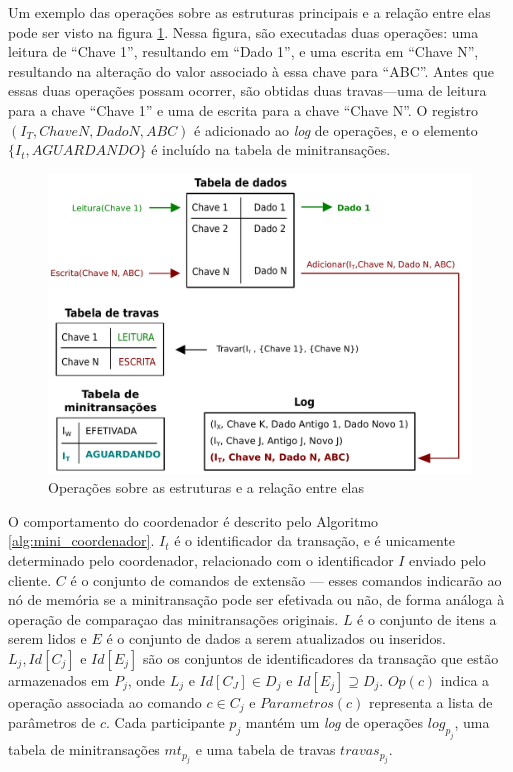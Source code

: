 \documentclass[11pt,twoside,a4paper]{book}
\begin{document}
Um exemplo das operações sobre as estruturas principais e a relação entre elas pode ser visto na figura \ref{fig:estruturas}. Nessa figura, são executadas duas operações: uma leitura de ``Chave 1'', resultando em ``Dado 1'', e uma escrita em ``Chave N'', resultando na alteração do valor associado à essa chave para ``ABC''. Antes que essas duas operações possam ocorrer, são obtidas duas travas---uma de leitura para a chave ``Chave 1'' e uma de escrita para a chave ``Chave N''. O registro $(I_T, Chave N, Dado N, ABC)$ é adicionado ao \emph{log} de operações, e o elemento $\{I_t, AGUARDANDO\}$ é incluído na tabela de minitransações.

\begin{figure}
  \centering
  \includegraphics[width=.90\textwidth]{estruturas} 
  \caption{Operações sobre as estruturas e a relação entre elas}
  \label{fig:estruturas} 
\end{figure}

O comportamento do coordenador é descrito pelo Algoritmo \ref{alg:mini_coordenador}. $I_t$ é o identificador da transação, e é unicamente determinado pelo coordenador, relacionado com o identificador $I$ enviado pelo cliente. $C$ é o conjunto de comandos de extensão --- esses comandos indicarão ao nó de memória se a minitransação pode ser efetivada ou não, de forma análoga à operação de comparaçao das minitransações originais. $L$ é o conjunto de itens a serem lidos e $E$ é o conjunto de dados a serem atualizados ou inseridos. $L_j, Id[C_j]\text{ e } Id[E_j]$ são os conjuntos de identificadores da transação que estão armazenados em $P_j$, onde $L_j\text{ e }Id[C_J] \in D_j\text{ e }Id[E_j] \supseteq D_j$. $Op(c)$ indica a operação associada ao comando $c \in C_j$ e $Parametros(c)$ representa a lista de parâmetros de $c$. Cada participante $p_j$ mantém um \emph{log} de operações $log_{p_j}$, uma tabela de minitransações $mt_{p_j}$ e uma tabela de travas $travas_{p_j}$.
\end{document}
